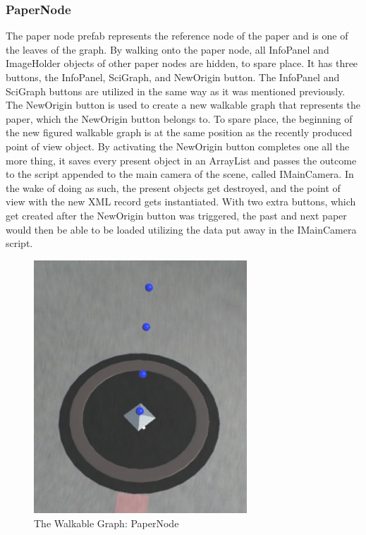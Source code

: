 \documentclass[12pt,a4paper,oneside,american,parskip=half]{article}
\begin{document}
\begin{justify}
\begin{normalsize}
\subsubsection{PaperNode}
The paper node prefab represents the reference node of the paper and is one of the leaves of the graph. By walking onto the paper node, all InfoPanel and ImageHolder objects of other paper nodes are hidden, to spare place. It has three buttons, the InfoPanel, SciGraph, and NewOrigin button. The InfoPanel and SciGraph buttons are utilized in the same way as it was mentioned previously. The NewOrigin button is used to create a new walkable graph that represents the paper, which the NewOrigin button belongs to.
\newline
To spare place, the beginning of the new figured walkable graph is at the same position as the recently produced point of view object. By activating the NewOrigin button completes one all the more thing, it saves every present object in an ArrayList and passes the outcome to the script appended to the main camera of the scene, called IMainCamera. In the wake of doing as such, the present objects get destroyed, and the point of view with the new XML record gets instantiated. With two extra buttons, which get created after the NewOrigin button was triggered, the past and next paper would then be able to be loaded utilizing the data put away in the IMainCamera script.
\clearpage

\begin{figure}[h!]
\centering
\includegraphics[width= 8cm]{paperNode.jpg}
\caption{The Walkable Graph: PaperNode}
\end{figure} \par


\end{normalsize}
\end{justify}
\end{document}
